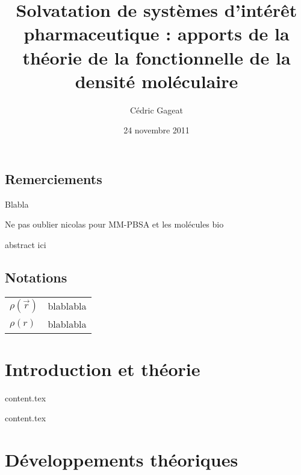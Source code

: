 \documentclass{bredele}
\title{Solvatation de systèmes d’intérêt pharmaceutique : apports de la théorie de la fonctionnelle de la densité moléculaire}
\author{Cédric Gageat}
\date{24 novembre 2011}
\begin{document}
\tikzexternaldisable
\maketitle
\tikzexternalenable

\cleardoublepage
	
\frontmatter
\chapter*{Remerciements}
Blabla

Ne pas oublier nicolas pour MM-PBSA et les molécules bio

\clearpage

abstract ici

\clearemptydoublepage



\renewcommand\contentsname{Sommaire}
\tableofcontents
 
 
\renewcommand{\cftdotsep}{\cftnodots}
\cleardoublepage
\listoffigures
\cleardoublepage
\listoftables


\clearemptydoublepage
\chapter*{Notations}
\thispagestyle{empty}
\begin{tabular}{ll}
$\rho(\vec{r})$ & blablabla \\
$\rho(r)$ & blablabla 
\end{tabular}




\clearemptydoublepage
\mainmatter

\part{Introduction et théorie}

\clearemptydoublepage
{content.tex}

\clearemptydoublepage
{content.tex}

\part{Développements théoriques}
\end{document}

